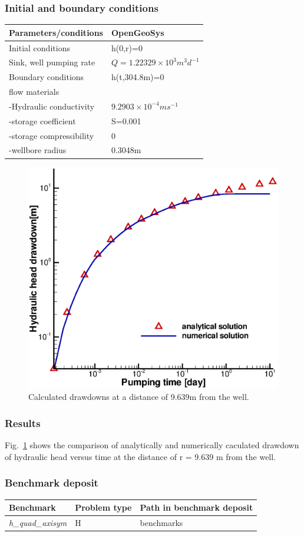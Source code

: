 \subsubsection*{Initial and boundary conditions}
%
\begin{tabular}{|l|l|}
  \hline
  Parameters/conditions & OpenGeoSys \\
  \hline
  Initial conditions & h(0,r)=0  \\
  \hline
  Sink, well pumping rate & $Q=1.22329\times 10^{3} m^{3} d^{-1}$  \\
  \hline
  Boundary conditions & h(t,304.8m)=0  \\
  \hline
   flow materials&   \\
  \hline
    -Hydraulic conductivity & $9.2903\times 10^{-4}m s^{-1}$  \\
  \hline
    -storage coefficient & S=0.001   \\
  \hline
    -storage compressibility & 0  \\
  \hline
    -wellbore radius & 0.3048m  \\
  \hline
\end{tabular}
%
\begin{figure} [htb!]
 \centering
\includegraphics[width=0.7\columnwidth] {H_GW/figures/Theis1.eps}
\caption{Calculated drawdowns at a distance of 9.639m from the well.}
 \label{Theis1}
\end{figure}
%
%
\subsubsection*{Results}
Fig.~\ref{Theis1} shows the comparison of analytically and numerically caculated drawdown of hydraulic head versus time at the distance of r = 9.639 m from the well.
\subsubsection*{Benchmark deposit}
%
\begin{tabular}{|l|l|l|}
  \hline
  Benchmark & Problem type & Path in benchmark deposit \\
  \hline
  \emph{h\_quad\_axisym} & H & benchmarks\verb \H\Theis_1D\ \\
  \hline
\end{tabular}

